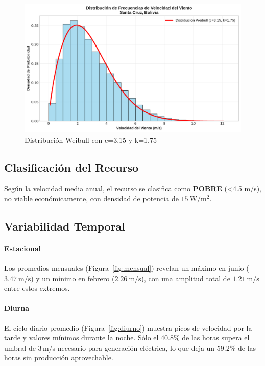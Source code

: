 \documentclass[a4paper,12pt]{article}
\begin{document}
		\begin{figure}[H]
			\centering
			\includegraphics[width=0.7\linewidth]{histograma_velocidades}
			\caption{Distribución Weibull con c=3.15 y k=1.75}
			\label{fig:histogramavelocidades}
		\end{figure}
	\subsection{Clasificación del Recurso}
		Según la velocidad media anual, el recurso se clasifica como \textbf{POBRE} (<4.5 m/s), no viable económicamente, con densidad de potencia de $15\ \mathrm{W/m^2}$.
	\subsection{Variabilidad Temporal}
	
	\paragraph{Estacional}  
	Los promedios mensuales (Figura~\ref{fig:mensual}) revelan un máximo en junio ($3.47\ \mathrm{m/s}$) y un mínimo en febrero ($2.26\ \mathrm{m/s}$), con una amplitud total de $1.21\ \mathrm{m/s}$ entre estos extremos.
	
	\paragraph{Diurna}  
	El ciclo diario promedio (Figura~\ref{fig:diurno}) muestra picos de velocidad por la tarde y valores mínimos durante la noche. Sólo el 40.8\% de las horas supera el umbral de 3\,m/s necesario para generación eléctrica, lo que deja un 59.2\% de las horas sin producción aprovechable.
	
\end{document}
